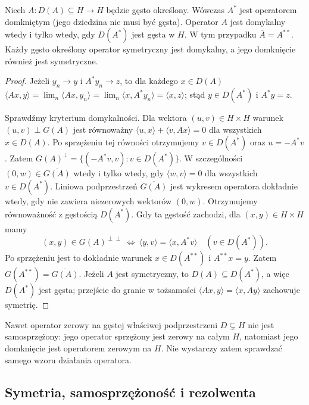 \begin{twierdzenie}
\label{thm:closable-adjoint33}
Niech $A:D(A)\subseteq H\to H$ będzie gęsto określony.
Wówczas $A^*$ jest operatorem domkniętym (jego dziedzina
nie musi być gęsta). Operator $A$ jest domykalny wtedy i tylko wtedy,
gdy $D(A^*)$ jest gęsta w $H$. W tym przypadku
$\overline A=A^{**}$. Każdy gęsto określony operator symetryczny
jest domykalny, a jego domknięcie również jest symetryczne.
\end{twierdzenie}
\begin{proof}
Jeżeli $y_n\to y$ i $A^*y_n\to z$, to dla każdego $x\in D(A)$
$\langle Ax,y\rangle=\lim_n\langle Ax,y_n\rangle
=\lim_n\langle x,A^*y_n\rangle=\langle x,z\rangle$;
stąd $y\in D(A^*)$ i $A^*y=z$.

Sprawdźmy kryterium domykalności. Dla wektora $(u,v)\in H\times H$
warunek $(u,v)\perp G(A)$ jest równoważny
$\langle u,x\rangle+\langle v,Ax\rangle=0$ dla wszystkich
$x\in D(A)$. Po sprzężeniu tej równości otrzymujemy
$v\in D(A^*)$ oraz $u=-A^*v$. Zatem
$G(A)^\perp=\{(-A^*v,v):v\in D(A^*)\}$.
W szczególności $(0,w)\in\overline{G(A)}$ wtedy i tylko wtedy,
gdy $\langle w,v\rangle=0$ dla wszystkich $v\in D(A^*)$.
Liniowa podprzestrzeń $\overline{G(A)}$ jest wykresem operatora
dokładnie wtedy, gdy nie zawiera niezerowych wektorów $(0,w)$.
Otrzymujemy równoważność z gęstością $D(A^*)$.
Gdy ta gęstość zachodzi, dla $(x,y)\in H\times H$ mamy
\[
 (x,y)\in G(A)^{\perp\perp}
 \ \Longleftrightarrow\
 \langle y,v\rangle=\langle x,A^*v\rangle
 \quad(v\in D(A^*)).
\]
Po sprzężeniu jest to dokładnie warunek $x\in D(A^{**})$
i $A^{**}x=y$. Zatem $G(A^{**})=\overline{G(A)}$.
Jeżeli $A$ jest symetryczny, to $D(A)\subseteq D(A^*)$, a więc
$D(A^*)$ jest gęsta; przejście do granic w tożsamości
$\langle Ax,y\rangle=\langle x,Ay\rangle$ zachowuje symetrię.
\end{proof}

\begin{uwaga}
Nawet operator zerowy na gęstej właściwej podprzestrzeni $D\subsetneq H$
nie jest samosprzężony: jego operator sprzężony jest zerowy na całym
$H$, natomiast jego domknięcie jest operatorem zerowym na $H$.
Nie wystarczy zatem sprawdzać samego wzoru działania operatora.
\end{uwaga}

\subsection{Symetria, samosprzężoność i rezolwenta}

